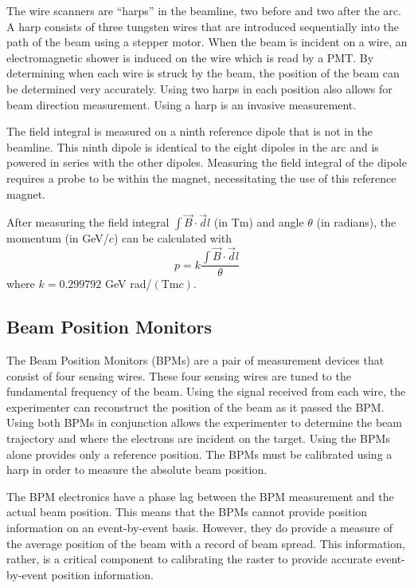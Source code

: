 The wire scanners are ``harps'' in the beamline, two before and two after the arc. A harp consists of three tungsten wires that are introduced sequentially into the path of the beam using a stepper motor. When the beam is incident on a wire, an electromagnetic shower is induced on the wire which is read by a PMT. By determining when each wire is struck by the beam, the position of the beam can be determined very accurately. Using two harps in each position also allows for beam direction measurement. Using a harp is an invasive measurement. 

The field integral is measured on a ninth reference dipole that is not in the beamline. This ninth dipole is identical to the eight dipoles in the arc and is powered in series with the other dipoles. Measuring the field integral of the dipole requires a probe to be within the magnet, necessitating the use of this reference magnet.\cite{HASEM}

After measuring the field integral $\int\vec{B}\cdot\vec{d}l$ (in Tm) and angle $\theta$ (in radians), the momentum (in GeV/$c$) can be calculated with
\begin{equation}
	p = k\frac{\int\vec{B}\cdot\vec{d}l}{\theta}
\end{equation}
where $k=0.299792$ GeV rad/$\left(\textrm{Tm}c\right)$.

\subsection{Beam Position Monitors}

The Beam Position Monitors (BPMs) are a pair of measurement devices that consist of four sensing wires. These four sensing wires are tuned to the fundamental frequency of the beam. Using the signal received from each wire, the experimenter can reconstruct the position of the beam as it passed the BPM. Using both BPMs in conjunction allows the experimenter to determine the beam trajectory and where the electrons are incident on the target. Using the BPMs alone provides only a reference position. The BPMs must be calibrated using a harp in order to measure the absolute beam position.

The BPM electronics have a phase lag between the BPM measurement and the actual beam position. This means that the BPMs cannot provide position information on an event-by-event basis. However, they do provide a measure of the average position of the beam with a record of beam spread. This information, rather, is a critical component to calibrating the raster to provide accurate event-by-event position information.

